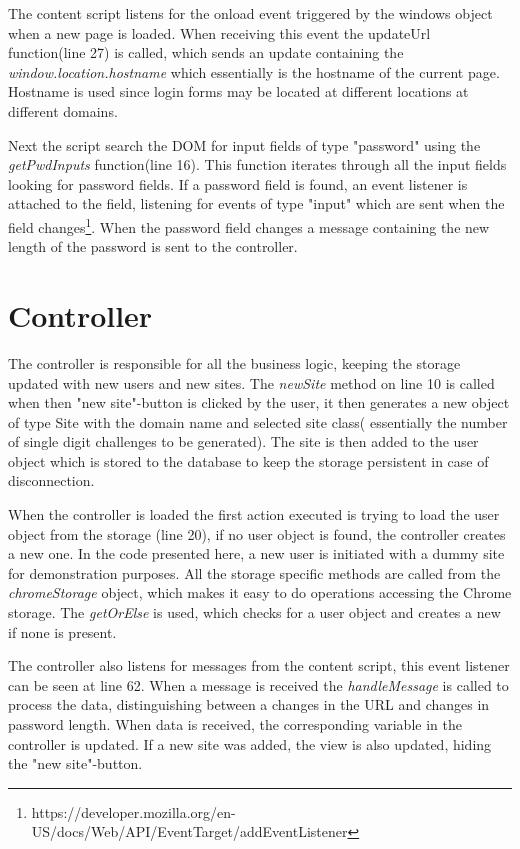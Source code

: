 The content script listens for the onload event triggered by the windows object when a new page is loaded. When receiving this event the updateUrl function(line 27) is called, which sends an update containing the \emph{window.location.hostname} which essentially is the hostname of the current page. Hostname is used since login forms may be located at different locations at different domains.
\par Next the script search the DOM for input fields of type "password" using the \emph{getPwdInputs} function(line 16). This function iterates through all the input fields looking for password fields. If a password field is found, an event listener is attached to the field, listening for events of type "input" which are sent when the field changes\footnote{https://developer.mozilla.org/en-US/docs/Web/API/EventTarget/addEventListener}. When the password field changes a message containing the new length of the password is sent to the controller. 

\section{Controller}\label{app:controller}

The controller is responsible for all the business logic, keeping the storage updated with new users and new sites. The \emph{newSite} method on line 10 is called when then "new site"-button is clicked by the user, it then generates a new object of type Site with the domain name and selected site class( essentially the number of single digit challenges to be generated). The site is then added to the user object which is stored to the database to keep the storage persistent in case of disconnection. 
\par When the controller is loaded the first action executed is trying to load the user object from the storage (line 20), if no user object is found, the controller creates a new one. In the code presented here, a new user is initiated with a dummy site for demonstration purposes. All the storage specific methods are called from the \emph{chromeStorage} object, which makes it easy to do operations accessing the Chrome storage. The \emph{getOrElse} is used, which checks for a user object and creates a new if none is present. 
\par The controller also listens for messages from the content script, this event listener can be seen at line 62. When a message is received the \emph{handleMessage} is called to process the data, distinguishing between a changes in the URL and changes in password length. When data is received, the corresponding variable in the controller is updated. If a new site was added, the view is also updated, hiding the "new site"-button.


